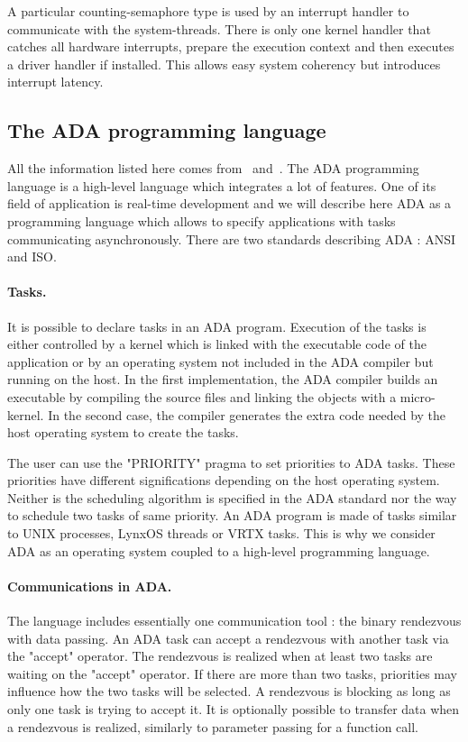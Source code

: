 \documentclass[10pt]{report}
\begin{document}
A particular counting-semaphore type is used by an interrupt handler to communicate with the system-threads. There is only one
kernel handler that catches all hardware interrupts, prepare the execution context and then executes a driver handler if installed.
This allows easy system coherency but introduces interrupt latency.

\subsection{The ADA programming language}

All the information listed here comes from~\cite{Booch:86} and~\cite{ADA:83}. The ADA programming language is a high-level language
which integrates a lot of features. One of its field of application is real-time development and we will describe here ADA
as a programming language which allows to specify applications with tasks communicating asynchronously. There are two standards
describing ADA : ANSI and ISO.

\paragraph{Tasks.} It is possible to declare tasks in an ADA program. Execution of the tasks is either controlled by a kernel which is 
linked with the executable code of the application or by an operating system not included in the ADA compiler but running on the host. 
In the first implementation, the ADA compiler builds an executable by compiling the source files and linking the objects with a micro-kernel. 
In the second case, the compiler generates the extra code needed by the host operating system to create the tasks.

The user can use the "PRIORITY" pragma to set priorities to ADA tasks. These priorities have different significations
depending on the host operating system. Neither is the scheduling algorithm is specified in the ADA standard nor the way to schedule
two tasks of same priority. An ADA program is made of tasks similar to UNIX processes, LynxOS threads or VRTX tasks. This
is why we consider ADA as an operating system coupled to a high-level programming language.

\paragraph{Communications in ADA.} The language includes essentially one communication tool : the binary rendezvous with data passing.
An ADA task can accept a rendezvous with another task via the "accept" operator. The rendezvous is realized when at least two
tasks are waiting on the "accept" operator. If there are more than two tasks, priorities may influence how the two tasks will be selected.
A rendezvous is blocking as long as only one task is trying to accept it. It is optionally possible to transfer data when a
rendezvous is realized, similarly to parameter passing for a function call.
\end{document}
